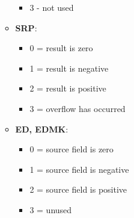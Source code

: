 \documentclass{report}
\begin{document}
\begin{itemize}
\begin{itemize}
\begin{itemize}
                        \item 3 - not used
                    \end{itemize}
                \item \textbf{SRP}:
                    \begin{itemize}
                        \item 0 = result is zero
                        \item 1 = result is negative
                        \item 2 = result is positive
                        \item 3 = overflow has occurred
                    \end{itemize}
                \item \textbf{ED, EDMK}:
                    \begin{itemize}
                        \item 0 = source field is zero 
                        \item 1 = source field is negative 
                        \item 2 = source field is positive
                        \item 3 = unused
                    \end{itemize}
            \end{itemize}
    \end{itemize}

    \pagebreak 
\end{document}
